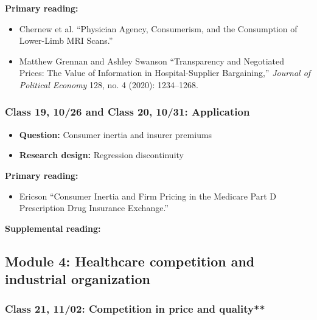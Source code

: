 \documentclass[11pt,]{article}
\providecommand{\tightlist}{%
  \setlength{\itemsep}{0pt}\setlength{\parskip}{0pt}}
\begin{document}
\textbf{Primary reading:}

\begin{itemize}
\tightlist
\item
  Chernew et al. {``Physician Agency, Consumerism, and the Consumption
  of Lower-Limb {MRI} Scans.''}
\item
  Matthew Grennan and Ashley Swanson {``Transparency and Negotiated
  Prices: {The} Value of Information in Hospital-Supplier Bargaining,''}
  \emph{Journal of Political Economy} 128, no. 4 (2020): 1234--1268.
\end{itemize}

\hypertarget{class-19-1026-and-class-20-1031-application}{%
\subsubsection{Class 19, 10/26 and Class 20, 10/31:
Application}\label{class-19-1026-and-class-20-1031-application}}

\begin{itemize}
\tightlist
\item
  \textbf{Question:} Consumer inertia and insurer premiums
\item
  \textbf{Research design:} Regression discontinuity
\end{itemize}

\textbf{Primary reading:}

\begin{itemize}
\tightlist
\item
  Ericson {``Consumer Inertia and Firm Pricing in the {Medicare} {Part}
  {D} Prescription Drug Insurance Exchange.''}
\end{itemize}

\textbf{Supplemental reading:}

\hypertarget{module-4-healthcare-competition-and-industrial-organization}{%
\subsection{Module 4: Healthcare competition and industrial
organization}\label{module-4-healthcare-competition-and-industrial-organization}}

\hypertarget{class-21-1102-competition-in-price-and-quality}{%
\subsubsection{Class 21, 11/02: Competition in price and
quality**}\label{class-21-1102-competition-in-price-and-quality}}
\end{document}

